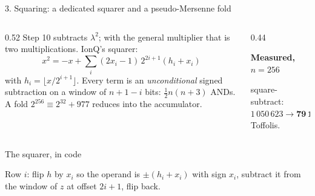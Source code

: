 \documentclass[aspectratio=169,11pt]{beamer}
\newcommand{\peachtitle}[1]{{\bfseries\color{cverm}#1}\par\vskip1mm}
\newcommand{\code}[2][]{}
\begin{document}
\setcounter{framenumber}{169}
\begin{frame}{3. Squaring: a dedicated squarer and a pseudo-Mersenne fold}
  \begin{columns}[T]
    \begin{column}{0.52\textwidth}
      Step 10 subtracts $\lambda^2$; with the general multiplier that is two multiplications. IonQ's squarer:
      \[ x^2=-x+\sum_i(2x_i-1)\,2^{2i+1}(h_i+x_i) \]
      with $h_i=\lfloor x/2^{i+1}\rfloor$. Every term is an \emph{unconditional} signed subtraction on a window of $n+1-i$ bits: $\tfrac12n(n+3)$ ANDs. A fold $2^{256}\equiv2^{32}+977$ reduces into the accumulator.
    \end{column}
    \begin{column}{0.44\textwidth}
      \centering
      \begin{peachblock}\peachtitle{Measured, $n=256$}
        square-subtract: $1\,050\,623\to\mathbf{79\,160}$ Toffolis.
      \end{peachblock}
    \end{column}
  \end{columns}
\end{frame}

\setcounter{framenumber}{170}
\begin{frame}[fragile]{The squarer, in code}
  \code[basicstyle=\ttfamily\footnotesize]{sqr_int.py}
  \vskip2mm
  Row $i$: flip $h$ by $x_i$ so the operand is $\pm(h_i+x_i)$ with sign $x_i$, subtract it from the window of $z$ at offset $2i+1$, flip back.
\end{frame}
\end{document}
